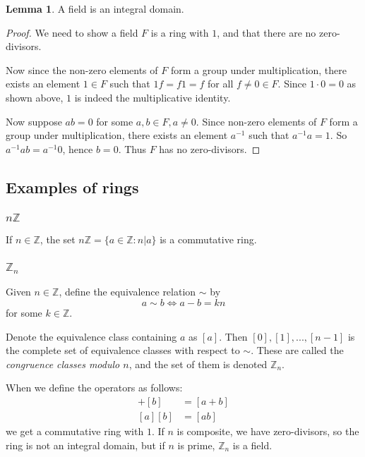 \documentclass{article}
\theoremstyle{definition}
\newtheorem{lemma}[theorem]{Lemma}
\begin{document}
  \begin{lemma}
    A field is an integral domain.
  \end{lemma}

  \begin{proof}
    We need to show a field $F$ is a ring with $1$, and that there are no zero-divisors.

    Now since the non-zero elements of $F$ form a group under multiplication,
    there exists an element $1 \in F$ such that $1f = f1 = f$ for all $f \neq 0 \in F$.
    Since $1 \cdot 0 = 0$ as shown above, $1$ is indeed the multiplicative identity.

    Now suppose $ab = 0$ for some $a, b \in F, a \neq 0$. Since non-zero elements of $F$
    form a group under multiplication, there exists an element $a^{-1}$ such that
    $a^{-1}a = 1$. So $a^{-1}ab = a^{-1}0$, hence $b = 0$. Thus $F$ has no zero-divisors.
  \end{proof}

  \subsection{Examples of rings}

  \subsubsection{$n\mathbb{Z}$}
  If $n \in \mathbb{Z}$, the set $n\mathbb{Z} = \lbrace a \in \mathbb{Z} : n | a \rbrace$
  is a commutative ring.

  \subsubsection{$\mathbb{Z}_{n}$}
  Given $n \in \mathbb{Z}$, define the equivalence relation $\sim$ by
  \[
    a \sim b \iff a - b = kn
  \]
  for some $k \in \mathbb{Z}$.

  Denote the equivalence class containing $a$ as $[a]$.
  Then $[0], [1], ..., [n-1]$ is the complete set of equivalence classes with respect
  to $\sim$. These are called the \emph{congruence classes modulo $n$}, and the set of
  them is denoted $\mathbb{Z}_{n}$.

  When we define the operators as follows:
  \begin{align*}
    [a] + [b] &= [a + b]\\
    [a][b] &= [ab]
  \end{align*}
  we get a commutative ring with $1$. If $n$ is composite, we have zero-divisors, so
  the ring is not an integral domain, but if $n$ is prime, $\mathbb{Z}_{n}$ is a field.
\end{document}
